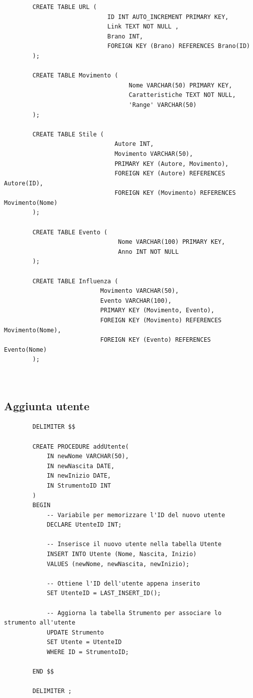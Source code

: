\documentclass{article}
\begin{document}
\begin{verbatim}
        CREATE TABLE URL (
                             ID INT AUTO_INCREMENT PRIMARY KEY,
                             Link TEXT NOT NULL ,
                             Brano INT,
                             FOREIGN KEY (Brano) REFERENCES Brano(ID)
        );

        CREATE TABLE Movimento (
                                   Nome VARCHAR(50) PRIMARY KEY,
                                   Caratteristiche TEXT NOT NULL,
                                   'Range' VARCHAR(50)
        );

        CREATE TABLE Stile (
                               Autore INT,
                               Movimento VARCHAR(50),
                               PRIMARY KEY (Autore, Movimento),
                               FOREIGN KEY (Autore) REFERENCES Autore(ID),
                               FOREIGN KEY (Movimento) REFERENCES Movimento(Nome)
        );

        CREATE TABLE Evento (
                                Nome VARCHAR(100) PRIMARY KEY,
                                Anno INT NOT NULL
        );

        CREATE TABLE Influenza (
                           Movimento VARCHAR(50),
                           Evento VARCHAR(100),
                           PRIMARY KEY (Movimento, Evento),
                           FOREIGN KEY (Movimento) REFERENCES Movimento(Nome),
                           FOREIGN KEY (Evento) REFERENCES Evento(Nome)
        );



    \end{verbatim}
    
    \subsection{Aggiunta utente}
    
    \begin{verbatim}
        DELIMITER $$

        CREATE PROCEDURE addUtente(
            IN newNome VARCHAR(50),
            IN newNascita DATE,
            IN newInizio DATE,
            IN StrumentoID INT
        )
        BEGIN
            -- Variabile per memorizzare l'ID del nuovo utente
            DECLARE UtenteID INT;

            -- Inserisce il nuovo utente nella tabella Utente
            INSERT INTO Utente (Nome, Nascita, Inizio)
            VALUES (newNome, newNascita, newInizio);

            -- Ottiene l'ID dell'utente appena inserito
            SET UtenteID = LAST_INSERT_ID();

            -- Aggiorna la tabella Strumento per associare lo strumento all'utente
            UPDATE Strumento
            SET Utente = UtenteID
            WHERE ID = StrumentoID;

        END $$

        DELIMITER ;
    \end{verbatim}
    
\end{document}
